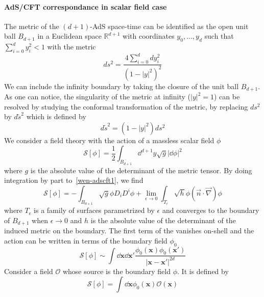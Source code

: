 \paragraph{AdS/CFT correspondance in scalar field case}
The metric of the $(d+1)$-AdS space-time can be identified as the open unit ball $B_{d+1}$ in a Euclidean space $\mathbb{R}^{d+1}$ with coordinates $y_0, \ldots, y_d$ such that $\sum_{i=0}^d y_i^2 <1$ with the metric
\begin{equation*}
ds^2 = \frac{4\sum_{i=0}^d dy_i^2}{(1 - |y|^2)^2}
\end{equation*}
We can include the infinity boundary by taking the closure of the unit ball $B_{d+1}$. 
As one can notice, the singularity of the metric at infinity ($|y|^2 = 1$) can be resolved by studying the conformal transformation of the metric, 
\ie by replacing $ds^2$ by $d\tilde{s}^2$ which is defined by
\begin{equation*}
d\tilde{s}^2 = (1 - |y|^2) ds^2
\end{equation*}
We consider a field theory with the action of a massless scalar field $\phi$
\begin{equation}\label{wen-adscft1}
\mathcal{S}[\phi] = \frac 1 2 \int_{B_{d+1}} \dd^{d+1} y \sqrt{g} |\dd \phi|^2
\end{equation}
where $g$ is the absolute value of the determinant of the metric tensor.
By doing integration by part to~\cref{wen-adscft1}, we find
\begin{equation*}
\mathcal{S}[\phi] = -\int_{B_{d+1}} \sqrt{g} \phi D_i D^i \phi + 
\lim_{\epsilon\rightarrow 0}\int_{T_\epsilon}  \sqrt{h} \phi (\vec{n}\cdot\vec{\nabla})\phi
\end{equation*}
where $T_\epsilon$ is a family of surfaces parametrized by $\epsilon$ and converges to the boundary of $B_{d+1}$ when $\epsilon\rightarrow 0$ and $h$ is the absolute value of the determinant of the induced metric on the boundary.
The first term of the \rhs vanishes on-shell and the action can be written in terms of the boundary field $\phi_0$
\begin{equation*}
\mathcal{S}[\phi] \sim \int \dd \mathbf{x} \dd \mathbf{x}' 
\frac{\phi_0(\mathbf{x})\phi_0(\mathbf{x}')}{|\mathbf{x} - \mathbf{x}'|^{2d}}
\end{equation*}
Consider a field $\mathcal{O}$ whose source is the boundary field $\phi$. 
It is defined by~\cite{Gubser1998}
\begin{equation*}
\mathcal{S}[\phi] = \int \dd \mathbf{x} \phi_0(\mathbf{x})\mathcal{O}(\mathbf{x})
\end{equation*}
